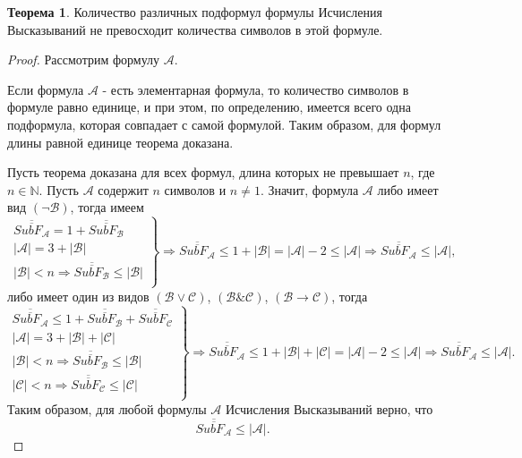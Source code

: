 \documentclass[a4paper,12pt]{article}
\renewcommand{\bar}[1]{\overline{#1}}
\theoremstyle{definition}
\newtheorem{theorem}{Теорема}
\begin{document}
	\begin{theorem}\label{CntSubF}
		Количество различных подформул формулы Исчисления Высказываний не превосходит количества символов в этой формуле.
		\begin{proof}
			Рассмотрим формулу $\mathcal{A}$.
			
			Если формула $\mathcal{A}$ - есть элементарная формула, то количество символов в формуле равно единице, и при этом, по определению, имеется всего одна подформула, которая совпадает с самой формулой. Таким образом, для формул длины равной единице теорема доказана.
			
			Пусть теорема доказана для всех формул, длина которых не превышает $ n$, где $n \in \mathbb{N}$. Пусть $ \mathcal{A}$ содержит $n$ символов и $n \neq 1$. Значит, формула $\mathcal{A}$ либо имеет вид $ \left( \lnot \mathcal{B} \right) $, тогда имеем
			\[
			\left.
			\begin{array}{ccc}
			\bar{\bar{ SubF_{\mathcal{A}} }}  = 1 + \bar{\bar{ SubF_{\mathcal{B}} }} \\
			\left| \mathcal{A} \right| = 3 + \left| \mathcal{B} \right|  \\
			\left| \mathcal{B} \right| < n \Rightarrow
			\bar{\bar{ SubF_{\mathcal{B}} }} \leq \left| \mathcal{B} \right|\\
			\end{array}
			\right\} 
			\Rightarrow 
			\bar{\bar{ SubF_{\mathcal{A}} }} \leq 1 + \left| \mathcal{B} \right| 
			= \left| \mathcal{A} \right| - 2 \leq \left| \mathcal{A} \right|
			\Rightarrow
			\bar{\bar{ SubF_{\mathcal{A}} }} \leq \left| \mathcal{A} \right|,
			\] 
			либо имеет один из видов $\left( \mathcal{B} \lor \mathcal{C} \right)$, $
			\left( \mathcal{B} \& \mathcal{C}\right)$, $  
			\left( \mathcal{B} \to \mathcal{C}\right)$, тогда
			\[
			\left.
			\begin{array}{ccc}
			\bar{\bar{ SubF_{\mathcal{A}} }}  \leq 1 + \bar{\bar{ SubF_{\mathcal{B}} }} + \bar{\bar{ SubF_{\mathcal{C}} }} \\
			\left| \mathcal{A} \right| = 3 + \left| \mathcal{B} \right| + \left| \mathcal{C} \right|  \\
			\left| \mathcal{B} \right| < n \Rightarrow
			\bar{\bar{ SubF_{\mathcal{B}} }} \leq \left| \mathcal{B} \right|\\
			\left| \mathcal{C} \right| < n \Rightarrow
			\bar{\bar{ SubF_{\mathcal{C}} }} \leq \left| \mathcal{C} \right|\\
			\end{array}
			\right\} 
			\Rightarrow 
			\bar{\bar{ SubF_{\mathcal{A}} }} \leq 1 + \left| \mathcal{B} \right| + \left| \mathcal{C} \right| 
			= \left| \mathcal{A} \right| - 2 \leq \left| \mathcal{A} \right|
			\Rightarrow
			\bar{\bar{ SubF_{\mathcal{A}} }} \leq \left| \mathcal{A} \right|.
			\]
			Таким образом, для любой формулы $\mathcal{A}$ Исчисления Высказываний верно, что
			\[ \bar{\bar{ SubF_{\mathcal{A}} }} \leq \left| \mathcal{A} \right|. \]			
		\end{proof}
	\end{theorem}
	
\end{document}
